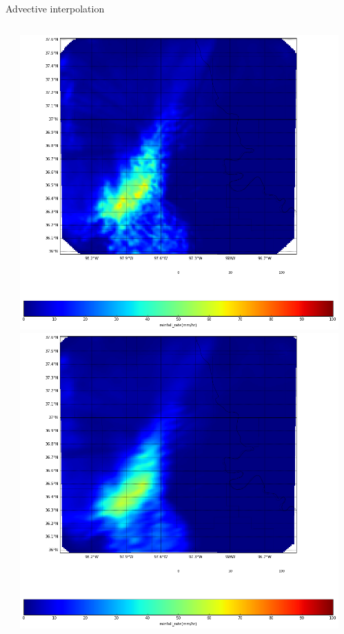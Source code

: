 \documentclass[final]{beamer}
\begin{document}
\begin{frame}{}
\begin{columns}[t]
\begin{column}{.3\linewidth}
    \end{column}
  \begin{column}{.3\linewidth}
  \vfill
   \begin{block}{Advective interpolation}
 	\begin{columns}[t]
		\begin{column}{.5\linewidth}
		\end{column}
                \begin{column}{.5\linewidth}
           		\includegraphics[width=1.0\linewidth]{figures/basic_accumulation.png}\\[1ex]     
            		\includegraphics[width=1.0\linewidth]{figures/advective_accum.png}\\[1ex]  
 		\end{column}
	\end{columns}
      \end{block}
   

\end{column}
\end{columns}
\end{frame}
\end{document}
